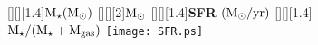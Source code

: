 \documentclass[a4paper,12pt]{article}
\begin{document}
\thispagestyle{empty}
\begin{figure}
[][][1.4]{{${{\bf {\rm  M}_{\star} ({\rm M}_{\odot}})}$}} 
[][][2]{${\rm M}_{\odot}$}
[][][1.4]{{\bf SFR $({\rm M}_{\odot}/{\rm{yr}})$}}
[][][1.4]{\bf ${\rm M_{\star}} / (\rm M_\star + M_{gas})$}
\texttt{[image: SFR.ps]}
\end{figure}
\end{document}

